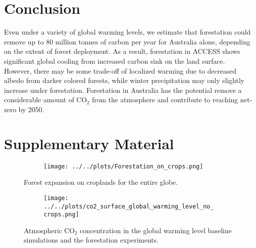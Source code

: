 \documentclass[]{article}
\begin{document}
\section{Conclusion}

Even under a variety of global warming levels, we estimate that forestation could remove up to 80 million tonnes of carbon per year for Australia alone, depending on the extent of forest deployment.
As a result, forestation in ACCESS shows significant global cooling from increased carbon sink on the land surface.
However, there may be some trade-off of localized warming due to decreased albedo from darker colored forests, while winter precipitation may only slightly increase under forestation.
Forestation in Australia has the potential remove a considerable amount of CO$_2$ from the atmosphere and contribute to reaching net-zero by 2050.


\printbibliography

\section{Supplementary Material}
\setcounter{figure}{0}

\begin{figure}[H]
    \centering
    \begin{subfigure}[b]{\linewidth}
        \texttt{[image: ../../plots/Forestation\_on\_crops.png]}
    \end{subfigure}
    \caption{Forest expansion on croplands for the entire globe.}
    \label{fig:global_forestation}
\end{figure}

\begin{figure}[H]
    \centering
    \begin{subfigure}[b]{\linewidth}
        \texttt{[image: ../../plots/co2\_surface\_global\_warming\_level\_no\_crops.png]}
    \end{subfigure}
    \caption{Atmospheric CO$_2$ concentration in the global warming level baseline simulations and the forestation experiments.}
    \label{fig:atmospheric_co2}
\end{figure}
\end{document}
